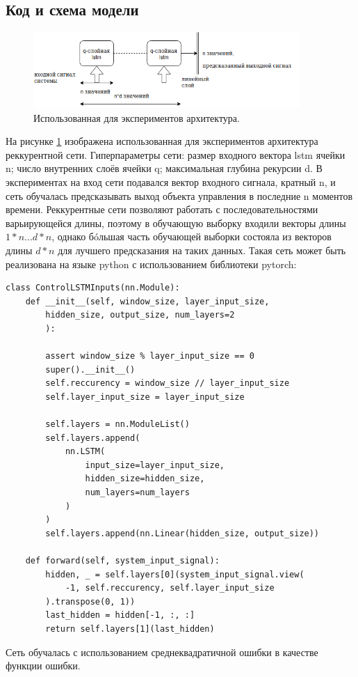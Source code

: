 \documentclass[12pt, oneside]{extbook}
\begin{document}
\begin{flushleft}
\section{Код и схема модели}
\par
\begin{figure}[h]
\centering
\includegraphics[width=0.9\textwidth]{rnn}
\caption{Использованная для экспериментов архитектура.}
\label{fig:lstm_net}
\end{figure}
На рисунке \ref{fig:lstm_net} изображена использованная для экспериментов архитектура реккурентной сети. Гиперпараметры сети: размер входного вектора lstm ячейки n; число внутренних слоёв ячейки q; максимальная глубина рекурсии d. В экспериментах на вход сети подавался вектор входного сигнала, кратный n, и сеть обучалась предсказывать выход объекта управления в последние n моментов времени. Реккурентные сети позволяют работать с последовательностями варьирующейся длины, поэтому в обучающую выборку входили векторы длины $1*n...d*n$, однако б\'oльшая часть обучающей выборки состояла из векторов длины $d*n$ для лучшего предсказания на таких данных. Такая сеть может быть реализована на языке python с использованием библиотеки pytorch:
\pagebreak
\begin{verbatim}
class ControlLSTMInputs(nn.Module):
    def __init__(self, window_size, layer_input_size,
        hidden_size, output_size, num_layers=2
        ):
        
        assert window_size % layer_input_size == 0
        super().__init__()
        self.reccurency = window_size // layer_input_size
        self.layer_input_size = layer_input_size
        
        self.layers = nn.ModuleList()
        self.layers.append(
            nn.LSTM(
                input_size=layer_input_size,
                hidden_size=hidden_size,
                num_layers=num_layers
            )
        )
        self.layers.append(nn.Linear(hidden_size, output_size))

    def forward(self, system_input_signal):
        hidden, _ = self.layers[0](system_input_signal.view(
            -1, self.reccurency, self.layer_input_size
        ).transpose(0, 1))
        last_hidden = hidden[-1, :, :]
        return self.layers[1](last_hidden)
\end{verbatim}
\par
Сеть обучалась с использованием среднеквадратичной ошибки в качестве функции ошибки.
\pagebreak

\end{flushleft}
\end{document}
